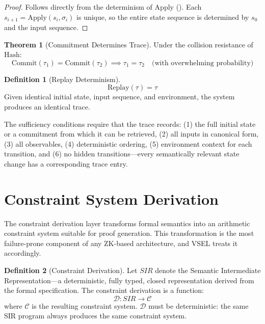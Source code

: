 \documentclass[11pt,a4paper]{article}
\theoremstyle{definition}
\newtheorem{definition}{Definition}[section]
\newtheorem{theorem}{Theorem}[section]
\newcommand{\Apply}{\mathrm{Apply}}
\newcommand{\Commit}{\mathrm{Commit}}
\newcommand{\Hash}{\mathrm{Hash}}
\newcommand{\Replay}{\mathrm{Replay}}
\begin{document}
\begin{proof}
Follows directly from the determinism of $\Apply$ (). Each $s_{i+1} = \Apply(s_i, \sigma_i)$ is unique, so the entire state sequence is determined by $s_0$ and the input sequence.
\end{proof}

\begin{theorem}[Commitment Determines Trace]
\label{thm:commitment-determines}
Under the collision resistance of $\Hash$:
\begin{equation}
\Commit(\tau_1) = \Commit(\tau_2) \implies \tau_1 = \tau_2 \quad \text{(with overwhelming probability)}
\end{equation}
\end{theorem}

\begin{definition}[Replay Determinism]
\label{def:replay}
\begin{equation}
\Replay(\tau) = \tau
\end{equation}
Given identical initial state, input sequence, and environment, the system produces an identical trace.
\end{definition}

The sufficiency conditions require that the trace records: (1) the full initial state or a commitment from which it can be retrieved, (2) all inputs in canonical form, (3) all observables, (4) deterministic ordering, (5) environment context for each transition, and (6) no hidden transitions---every semantically relevant state change has a corresponding trace entry.

\section{Constraint System Derivation}
\label{sec:constraint-system}

The constraint derivation layer transforms formal semantics into an arithmetic constraint system suitable for proof generation. This transformation is the most failure-prone component of any ZK-based architecture, and VSEL treats it accordingly.

\begin{definition}[Constraint Derivation]
\label{def:constraint-derivation}
Let $\mathit{SIR}$ denote the Semantic Intermediate Representation---a deterministic, fully typed, closed representation derived from the formal specification. The constraint derivation is a function:
\begin{equation}
\mathcal{D}: \mathit{SIR} \to \mathcal{C}
\end{equation}
where $\mathcal{C}$ is the resulting constraint system. $\mathcal{D}$ must be deterministic: the same SIR program always produces the same constraint system.
\end{definition}
\end{document}
